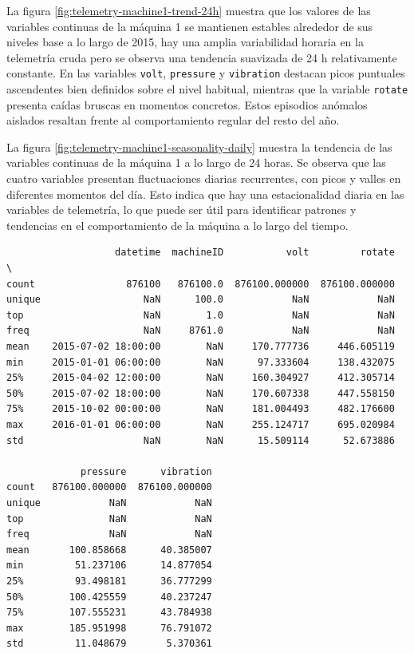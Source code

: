 \documentclass[IB]{TFUOC}
\begin{document}
La figura \ref{fig:telemetry-machine1-trend-24h} muestra que los valores de las variables continuas de la máquina
1 se mantienen estables alrededor de sus niveles base a lo largo de 2015, hay una amplia variabilidad horaria en la
telemetría cruda pero se observa una tendencia suavizada de 24 h relativamente constante. En las variables \texttt{volt},
\texttt{pressure} y \texttt{vibration} destacan picos puntuales ascendentes bien definidos sobre el nivel habitual,
mientras que la variable \texttt{rotate} presenta caídas bruscas en momentos concretos. Estos episodios anómalos
aislados resaltan frente al comportamiento regular del resto del año.

La figura \ref{fig:telemetry-machine1-seasonality-daily} muestra la tendencia de las variables continuas de la máquina
1 a lo largo de 24 horas. Se observa que las cuatro variables presentan fluctuaciones diarias recurrentes, con picos y
valles en diferentes momentos del día. Esto indica que hay una estacionalidad diaria en las variables de telemetría, lo
que puede ser útil para identificar patrones y tendencias en el comportamiento de la máquina a lo largo del tiempo.

\begin{listing}[H]
  \centering
  \begin{verbatim}
                   datetime  machineID           volt         rotate  \
count                876100   876100.0  876100.000000  876100.000000   
unique                  NaN      100.0            NaN            NaN   
top                     NaN        1.0            NaN            NaN   
freq                    NaN     8761.0            NaN            NaN   
mean    2015-07-02 18:00:00        NaN     170.777736     446.605119   
min     2015-01-01 06:00:00        NaN      97.333604     138.432075   
25%     2015-04-02 12:00:00        NaN     160.304927     412.305714   
50%     2015-07-02 18:00:00        NaN     170.607338     447.558150   
75%     2015-10-02 00:00:00        NaN     181.004493     482.176600   
max     2016-01-01 06:00:00        NaN     255.124717     695.020984   
std                     NaN        NaN      15.509114      52.673886   

             pressure      vibration  
count   876100.000000  876100.000000  
unique            NaN            NaN  
top               NaN            NaN  
freq              NaN            NaN  
mean       100.858668      40.385007  
min         51.237106      14.877054  
25%         93.498181      36.777299  
50%        100.425559      40.237247  
75%        107.555231      43.784938  
max        185.951998      76.791072  
std         11.048679       5.370361 
\end{verbatim}
  \caption{Resumen estadístico del DataFrame telemetry}
\end{listing}
\end{document}
